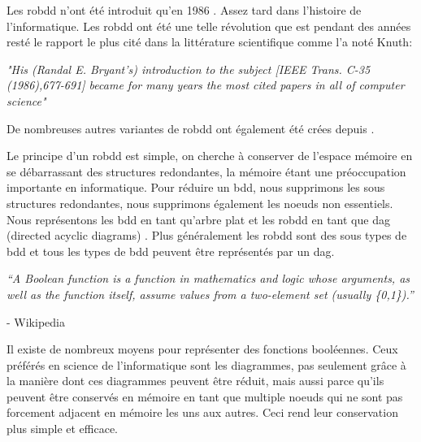 \documentclass[french]{article}
\begin{document}
Les robdd n'ont été introduit qu'en 1986 \cite{bryant_graph}. Assez tard dans l'histoire de l'informatique. Les robdd ont été une telle révolution que \cite{bryant_graph} est pendant des années resté le rapport le plus cité dans la littérature scientifique comme l'a noté Knuth:

\begin{center}
    \emph{"His (Randal E. Bryant's) introduction to the subject [IEEE Trans. C-35 (1986),677-691] became for many years the most cited papers in all of computer science"}
\end{center}

De nombreuses autres variantes de robdd ont également été crées depuis \cite{wegner}.\medskip

Le principe d'un robdd est simple, on cherche à conserver de l'espace mémoire en se débarrassant des structures redondantes, la mémoire étant une préoccupation importante en informatique. Pour réduire un bdd, nous supprimons les sous structures redondantes, nous supprimons également les noeuds non essentiels. Nous représentons les bdd en tant qu'arbre plat et les robdd en tant que dag (directed acyclic diagrams) \cite{flajolet_automata}. Plus généralement les robdd sont des sous types de bdd et tous les types de bdd peuvent être représentés par un dag.\medskip

\begin{center}
\emph{“A Boolean function is a function in mathematics and logic whose arguments, as well as the function itself, assume values from a two-element set (usually \{0,1\}).”} 
\end{center}

- Wikipedia 
\vspace{5mm} 

Il existe de nombreux moyens pour représenter des fonctions booléennes. Ceux préférés en science de l'informatique sont les diagrammes, pas seulement grâce à la manière dont ces diagrammes peuvent être réduit, mais aussi parce qu'ils peuvent être conservés en mémoire en tant que multiple noeuds qui ne sont pas forcement adjacent en mémoire les uns aux autres. Ceci rend leur conservation plus simple et efficace.
\end{document}
